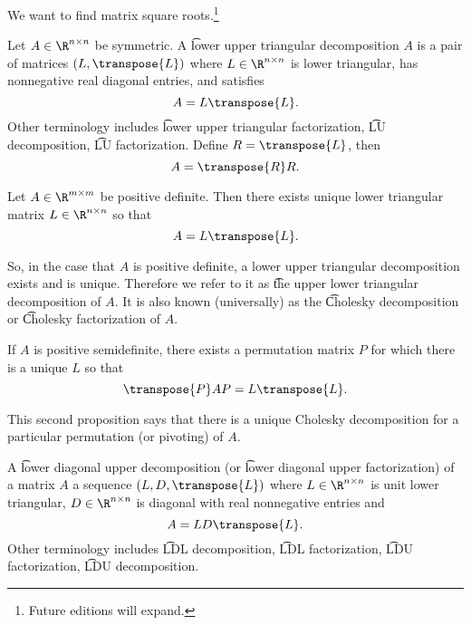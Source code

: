

We want to find matrix square roots.\footnote{Future editions will expand.}


Let $A \in \R^{n \times n}$ be symmetric.
A \t{lower upper triangular decomposition}
$A$ is a pair of matrices $(L, \transpose{L})$ where $L \in \R^{n \times n}$ is lower triangular, has nonnegative real diagonal entries, and satisfies
\[
  A = L\transpose{L}.
\]
Other terminology includes \t{lower upper triangular factorization}, \t{LU decomposition}, \t{LU factorization}.
Define $R = \transpose{L}$, then
\[
  A = \transpose{R}R.
\]


\begin{proposition}
  Let $A \in \R^{m \times m}$ be positive definite. Then there exists unique lower triangular matrix $L \in \R^{n \times n}$ so that
  \[
    A = L\transpose{L}.
  \]
\end{proposition}
So, in the case that $A$ is positive definite, a lower upper triangular decomposition exists and is unique.
Therefore we refer to it as \t{the upper lower triangular decomposition} of $A$.
It is also known (universally) as the \t{Cholesky decomposition} or \t{Cholesky factorization} of $A$.

\begin{proposition}
  If $A$ is positive semidefinite, there exists a permutation matrix $P$ for which there is a unique $L$ so that
  \[
    \transpose{P}AP = L\transpose{L}.
  \]
\end{proposition}

This second proposition says that there is a unique Cholesky decomposition for a particular permutation (or pivoting) of $A$.


A \t{lower diagonal upper decomposition} (or \t{lower diagonal upper factorization}) of a matrix $A$ a sequence $(L, D, \transpose{L})$ where $L \in \R^{n \times n}$ is unit lower triangular, $D \in \R^{n \times n}$ is diagonal with real nonnegative entries and
\[
  A = LD\transpose{L}.
\]
Other terminology includes \t{LDL decomposition}, \t{LDL factorization}, \t{LDU factorization}, \t{LDU decomposition}.


